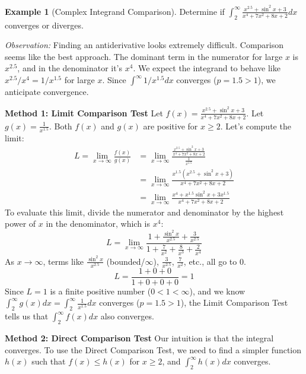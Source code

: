 \documentclass[11pt]{article}
\theoremstyle{definition}
\newtheorem{example}[theorem]{Example}
\theoremstyle{remark}
\begin{document}
\begin{example}[Complex Integrand Comparison] \label{ex:complex_compare}
Determine if $\int_2^\infty \frac{x^{2.5} + \sin^2 x + 3}{x^4 + 7x^2 + 8x + 2} dx$ converges or diverges.

\textit{Observation:} Finding an antiderivative looks extremely difficult. Comparison seems like the best approach. The dominant term in the numerator for large $x$ is $x^{2.5}$, and in the denominator it's $x^4$. We expect the integrand to behave like $x^{2.5}/x^4 = 1/x^{1.5}$ for large $x$. Since $\int^\infty 1/x^{1.5} dx$ converges ($p=1.5>1$), we anticipate convergence.

\textbf{Method 1: Limit Comparison Test}
Let $f(x) = \frac{x^{2.5} + \sin^2 x + 3}{x^4 + 7x^2 + 8x + 2}$. Let $g(x) = \frac{1}{x^{1.5}}$. Both $f(x)$ and $g(x)$ are positive for $x \ge 2$.
Let's compute the limit:
\begin{align*} L = \lim_{x \to \infty} \frac{f(x)}{g(x)} &= \lim_{x \to \infty} \frac{\frac{x^{2.5} + \sin^2 x + 3}{x^4 + 7x^2 + 8x + 2}}{\frac{1}{x^{1.5}}} \\ &= \lim_{x \to \infty} \frac{x^{1.5} (x^{2.5} + \sin^2 x + 3)}{x^4 + 7x^2 + 8x + 2} \\ &= \lim_{x \to \infty} \frac{x^4 + x^{1.5}\sin^2 x + 3x^{1.5}}{x^4 + 7x^2 + 8x + 2} \end{align*}
To evaluate this limit, divide the numerator and denominator by the highest power of $x$ in the denominator, which is $x^4$:
\[ L = \lim_{x \to \infty} \frac{1 + \frac{\sin^2 x}{x^{2.5}} + \frac{3}{x^{2.5}}}{1 + \frac{7}{x^2} + \frac{8}{x^3} + \frac{2}{x^4}} \]
As $x \to \infty$, terms like $\frac{\sin^2 x}{x^{2.5}}$ (bounded/$\infty$), $\frac{3}{x^{2.5}}$, $\frac{7}{x^2}$, etc., all go to 0.
\[ L = \frac{1 + 0 + 0}{1 + 0 + 0 + 0} = 1 \]
Since $L=1$ is a finite positive number ($0 < 1 < \infty$), and we know $\int_2^\infty g(x) dx = \int_2^\infty \frac{1}{x^{1.5}} dx$ converges ($p=1.5>1$), the Limit Comparison Test tells us that $\int_2^\infty f(x) dx$ also converges.

\textbf{Method 2: Direct Comparison Test}
Our intuition is that the integral converges. To use the Direct Comparison Test, we need to find a simpler function $h(x)$ such that $f(x) \le h(x)$ for $x \ge 2$, and $\int_2^\infty h(x) dx$ converges.


\end{example}
\end{document}

